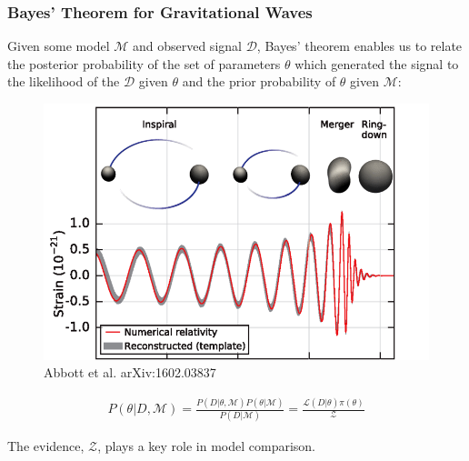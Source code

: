 \documentclass[aspectratio=169]{beamer}
\begin{document}
\begin{frame}
\frametitle{Bayes' Theorem for Gravitational Waves}
\begin{minipage}{\textwidth}\vspace{1em}
    Given some model $\mathcal{M}$ and observed signal $\mathcal{D}$, Bayes' theorem enables us to relate the posterior probability of the set of parameters $\theta$ which generated the signal to the likelihood of the $\mathcal{D}$ given $\theta$ and the prior probability of $\theta$ given $\mathcal{M}$:
\end{minipage}
\begin{minipage}{0.22\textwidth}\vspace{0.5em}
\begin{figure}
\centering
\includegraphics[height=0.95\textwidth]{Ca_Foscari Beamer/Screenshot from 2024-10-14 13-25-30.png}
\caption{\textcolor{cfgrey}{Abbott et al. arXiv:1602.03837}}
\end{figure}
\end{minipage}
\hspace{30pt}
\begin{minipage}{0.6\textwidth}
\centering
\begin{align*}
    P(\theta | D, \mathcal{M}) = \frac{P(D | \theta, \mathcal{M}) P(\theta | \mathcal{M})}{P(D | \mathcal{M})} = \frac{\mathcal{L}(D | \theta)\pi(\theta)}{\mathcal{Z}}
\end{align*}
\end{minipage}%
\vfill
\begin{minipage}{\textwidth}
The evidence, $\mathcal{Z}$, plays a key role in model comparison.
\end{minipage}
\end{frame}
\end{document}
